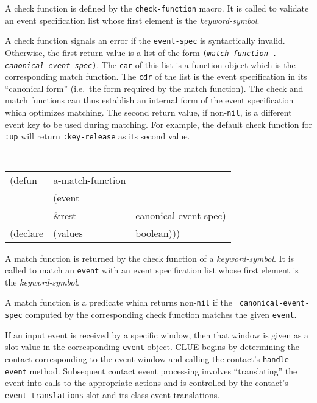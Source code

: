 \begin{flushright} \parbox[t]{6.125in}{
A check function is defined by the {\tt check-function} macro. It
is called to validate an event specification list whose first element is
the {\em keyword-symbol}.

A check function signals an error if the {\tt event-spec} is syntactically
invalid.  Otherwise, the first return value
is a list of the form {\tt ({\em match-function} . {\em
canonical-event-spec})}. The {\tt car} of this list is a function
object which is the corresponding match function. The {\tt cdr} of
the list is the event
specification in its ``canonical form'' (i.e.\  the form required by the match
function). The check and match functions can thus establish an internal form of
the event specification which optimizes matching. The second return value, if
non-{\tt nil}, is a different event key to be used during matching. For example,
the default check function for {\tt :up} will return {\tt :key-release}
as its second value.

}\end{flushright}


\begin{flushright} \parbox[t]{6.125in}{
\tt
\begin{tabular}{lll}
\raggedright
(defun & a-match-function & \\ 
& (event \\
& \&rest & canonical-event-spec) \\
(declare &(values  & boolean)))
\end{tabular}
\rm

}\end{flushright}

\begin{flushright} \parbox[t]{6.125in}{
A match function is returned by the check function of a
{\em keyword-symbol}. It
is called to match an {\tt event} with an event specification list whose
first element is the {\em keyword-symbol}.

A match function is a predicate which returns non-{\tt nil} if the {\tt
canonical-event-spec} computed by the corresponding check function matches the
given {\tt event}.


}\end{flushright}



If an input event is received by a specific window, then that window is given as
a slot value in the corresponding {\tt event} object. CLUE begins by determining
the contact corresponding to the event window and  calling the contact's
{\tt handle-event} method. 
Subsequent contact event processing
involves ``translating'' the event into calls to the appropriate
actions and is controlled by the contact's {\tt
event-translations} slot and its class event translations.

